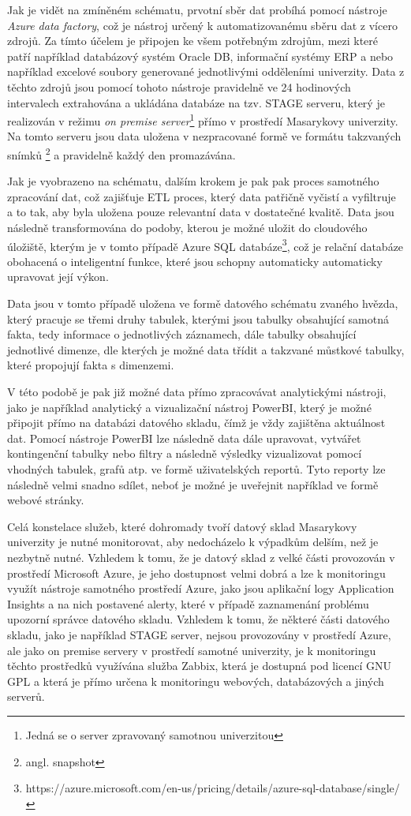 \documentclass[
  digital,     %
  twoside,     %
  lof,         %
  lot,         %
]{fithesis4}
\begin{document}
Jak je vidět na zmíněném schématu, prvotní sběr dat probíhá pomocí nástroje \emph{Azure data factory}, což je nástroj určený k automatizovanému sběru dat z vícero zdrojů. Za tímto účelem je připojen ke všem potřebným zdrojům, mezi které patří například databázový systém Oracle DB, informační systémy ERP a nebo například excelové soubory generované jednotlivými odděleními univerzity. Data z těchto zdrojů jsou pomocí tohoto nástroje pravidelně ve 24 hodinových intervalech extrahována a ukládána databáze na tzv. STAGE serveru, který je realizován v režimu \emph{on premise server}\footnote{Jedná se o server zpravovaný samotnou univerzitou} přímo v prostředí Masarykovy univerzity. Na tomto serveru jsou data uložena v nezpracované formě ve formátu takzvaných snímků \footnote{angl. snapshot} a pravidelně každý den promazávána.

Jak je vyobrazeno na schématu, dalším krokem je pak pak proces samotného zpracování dat, což zajišťuje ETL proces, který data patřičně vyčistí a vyfiltruje a to tak, aby byla uložena pouze relevantní data v dostatečné kvalitě. Data jsou následně transformována do podoby, kterou je možné uložit do cloudového úložiště, kterým je v tomto případě Azure SQL databáze\footnote{https://azure.microsoft.com/en-us/pricing/details/azure-sql-database/single/}, což je relační databáze obohacená o inteligentní funkce, které jsou schopny automaticky automaticky upravovat její výkon.

Data jsou v tomto případě uložena ve formě datového schématu zvaného hvězda, který pracuje se třemi druhy tabulek, kterými jsou tabulky obsahující samotná fakta, tedy informace o jednotlivých záznamech, dále tabulky obsahující jednotlivé dimenze, dle kterých je možné data třídit a takzvané můstkové tabulky, které propojují fakta s dimenzemi. 

V této podobě je pak již možné data přímo zpracovávat analytickými nástroji, jako je například analytický a vizualizační nástroj PowerBI, který je možné připojit přímo na databázi datového skladu, čímž je vždy zajištěna aktuálnost dat. Pomocí nástroje PowerBI lze následně data dále upravovat, vytvářet kontingenční tabulky nebo filtry a následně výsledky vizualizovat pomocí vhodných tabulek, grafů atp. ve formě uživatelských reportů. Tyto reporty lze následně velmi snadno sdílet, neboť je možné je uveřejnit například ve formě webové stránky.

Celá konstelace služeb, které dohromady tvoří datový sklad Masarykovy univerzity je nutné monitorovat, aby nedocházelo k výpadkům delším, než je nezbytně nutné. Vzhledem k tomu, že je datový sklad z velké části provozován v prostředí Microsoft Azure, je jeho dostupnost velmi dobrá a lze k monitoringu využít nástroje samotného prostředí Azure, jako jsou aplikační logy Application Insights a na nich postavené alerty, které v případě zaznamenání problému upozorní správce datového skladu. Vzhledem k tomu, že některé části datového skladu, jako je například STAGE server, nejsou provozovány v prostředí Azure, ale jako on premise servery v prostředí samotné univerzity, je k monitoringu těchto prostředků využívána služba Zabbix, která je dostupná pod licencí GNU GPL a která je přímo  určena k monitoringu webových, databázových a jiných serverů.
\end{document}
